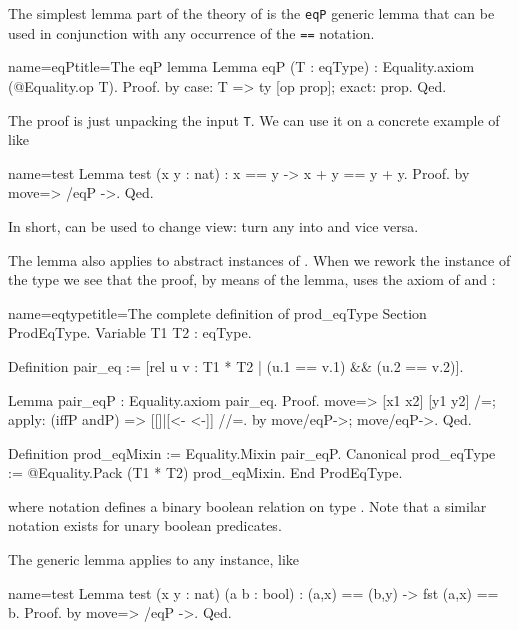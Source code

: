The simplest lemma part of the theory of  is the
\lstinline/eqP/ generic lemma that can be used in conjunction with
any occurrence of the \lstinline/==/ notation.

\begin{coq}{name=eqP}{title=The eqP lemma}
Lemma eqP (T : eqType) : Equality.axiom (@Equality.op T).
Proof. by case: T => ty [op prop]; exact: prop. Qed.
\end{coq}

The proof is just unpacking the input \lstinline/T/.
We can use it on a concrete example of  like 

\begin{coq}{name=test}{}
Lemma test (x y : nat) : x == y -> x + y == y + y.
Proof. by move=> /eqP ->. Qed.
\end{coq}

In short,  can be used to change view: turn any
\C{==} into \C{=} and vice versa.

The  lemma also applies to abstract instances of .
When we rework the instance of the type  we see that the
proof, by means of the  lemma, uses the axiom of  and
:

\begin{coq}{name=eqtype}{title=The complete definition of prod\_eqType}
Section ProdEqType.
Variable T1 T2 : eqType.

Definition pair_eq := [rel u v : T1 * T2 | (u.1 == v.1) && (u.2 == v.2)].

Lemma pair_eqP : Equality.axiom pair_eq.
Proof.
move=> [x1 x2] [y1 y2] /=; apply: (iffP andP) => [[]|[<- <-]] //=.
by move/eqP->; move/eqP->.
Qed.

Definition prod_eqMixin := Equality.Mixin pair_eqP.
Canonical prod_eqType := @Equality.Pack (T1 * T2) prod_eqMixin.
End ProdEqType.
\end{coq}
\index[coq]{\C{[pred x : T | E]}}
\index[coq]{\C{[rel x y : T | E]}}

where notation \C{[rel x y : T | E]} defines a binary boolean relation
on type . Note that a similar notation \C{[pred x : T | E]}
exists for unary boolean predicates.

The generic lemma  applies to
any  instance, like 

\begin{coq}{name=test}{}
Lemma test (x y : nat) (a b : bool) : (a,x) == (b,y) -> fst (a,x) == b.
Proof. by move=> /eqP ->. Qed.
\end{coq}

